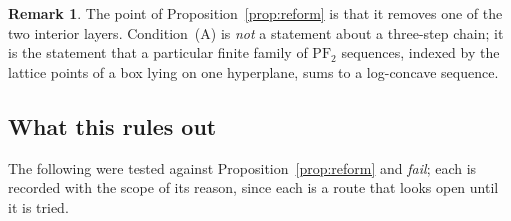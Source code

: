 \documentclass[11pt]{article}
\theoremstyle{plain}
\theoremstyle{definition}
\newtheorem{remark}[theorem]{Remark}
\newcommand{\PFtwo}{\mathrm{PF}_2}
\begin{document}
\begin{remark}
The point of Proposition~\ref{prop:reform} is that it removes one of the two interior
layers. Condition~(A) is \emph{not} a statement about a three-step chain; it is the
statement that a particular finite family of $\PFtwo$ sequences, indexed by the lattice
points of a box lying on one hyperplane, sums to a log-concave sequence.
\end{remark}

\subsection{What this rules out}

The following were tested against Proposition~\ref{prop:reform} and \emph{fail}; each is
recorded with the scope of its reason, since each is a route that looks open until it is
tried.
\end{document}
